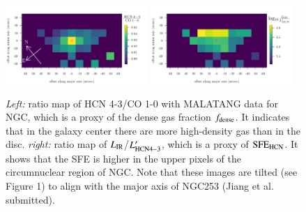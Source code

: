\documentclass[legal,11pt]{article}
\def\kms    {\ifmmode{{\rm \ts km\ts s}^{-1}}\else{\ts km\ts s$^{-1}$}\fi}
\def\kms    {km\,s$^{-1}$\,}
\def\,{\thinspace}
\def\LIR     {$L_{\rm IR}$}
\def\HCNtt        {HCN\,$J$=3$\rightarrow$2}
\begin{document}
\begin{figure}
\centering
\includegraphics[width=0.48\textwidth]{Jiang_hcn_to_co10.pdf}
\includegraphics[width=0.48\textwidth]{Jiang_Lir_Lhcn.pdf}
\caption{
{\it Left:} ratio map of HCN 4-3/CO 1-0 with MALATANG data for NGC\,253, which is a proxy of the dense gas fraction $f_{\rm dense}$. It indicates that in the galaxy center there are more high-density gas than in the disc.
{\it right:} ratio map of \LIR/$L'_{\rm HCN 4-3}$, which is a proxy of ${\rm SFE_{HCN}}$. It shows that the SFE is higher in the upper pixels of the circumnuclear region of NGC\,253.
Note that these images are tilted (see Figure 1) to align with the major axis of NGC253 (Jiang et al. submitted).
}
\label{fig:jiang_maps}
\end{figure}

\end{document}
